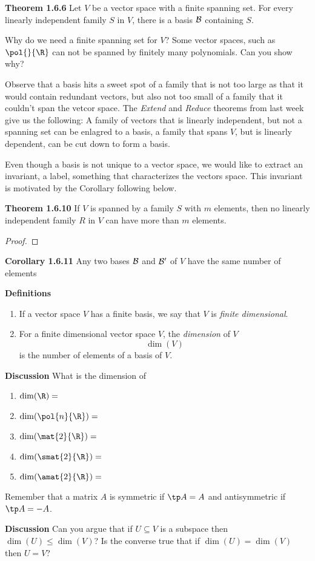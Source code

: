 \documentclass[letterpaper, 10pt]{article}
\begin{document}
\lb
\textbf{Theorem 1.6.6} 
\lb
Let $V$ be a vector space with a finite spanning set.
For every linearly independent family $S$ in $V$, there
is a basis $\cal B$ containing $S$.

\lb
Why do we need a finite spanning set for $V$? Some vector spaces, such as
$\pol{}{\R}$ can not be spanned by finitely many polynomials.
Can you show why?


\lb
Observe that a basis hits a sweet spot of a family that is not too
large as that it would contain redundant vectors, but also not too
small of a family that it couldn't span the vetcor space.
\pr
The \emph{Extend} and \emph{Reduce} theorems from last week
give us the following:
\lb
A family of vectors that is linearly independent, but not a spanning set can
be enlagred to a basis, a family that spans $V$, but is linearly
dependent, can be cut down to form a basis.


\newpage
\lb
Even though a basis is not unique to a vector space, we would like to extract
an invariant, a label, something that characterizes the vectors space.
This invariant is motivated by the Corollary following below.

\lb
\textbf{Theorem 1.6.10} 
\lb
If $V$ is spanned by a family $S$ with $m$ elements, then no linearly
independent family $R$ in $V$ can have more than $m$ elements.
\begin{proof}
    
\end{proof}


\lb
\textbf{Corollary 1.6.11}
\lb
Any two bases $\cal B$ and $\cal B'$ of $V$ have the same number of elements



\lb
\textbf{Definitions} 
\begin{enumerate}
    \item If a vector space $V$ has a finite basis, we say that $V$ is
        \emph{finite dimensional}.
    \item For a finite dimensional vector space $V$, the \emph{dimension}
        of $V$
        \[ \dim(V) \]
        is the number of elements of a basis of $V$.
\end{enumerate}



\lb
\textbf{Discussion} 
\lb
What is the dimension of 
\begin{enumerate}
    \item[] $\dim( \R ) = $
    \item[] $\dim( \pol{n}{\R} ) = $
    \item[] $\dim( \mat{2}{\R} ) = $
    \item[] $\dim( \smat{2}{\R} ) = $
    \item[] $\dim( \amat{2}{\R} ) = $
\end{enumerate}
\lb
Remember that a matrix $A$ is symmetric if $\tp A = A$ and antisymmetric if $\tp A = -A$.



\newpage
\lb
\textbf{Discussion}
\lb
Can you argue that if $U \subseteq V$ is a subspace then $\dim (U) \leq \dim(V)$?
\pr
Is the converse true that if $\dim (U) = \dim(V)$ then $U = V$?
\end{document}
